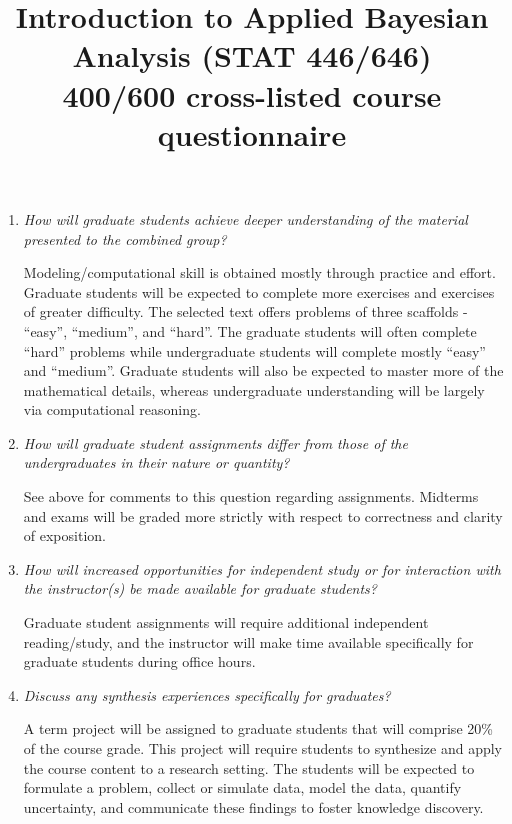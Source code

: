 \documentclass[11pt,onecolumn]{article}
\title{Introduction to Applied Bayesian Analysis (STAT 446/646) \\ 400/600 cross-listed course questionnaire}
\begin{document}
\date{}
\maketitle

\vspace{-0.75in}

\begin{enumerate}
\item \emph{How will graduate students achieve deeper understanding of the material presented to the combined group?}

  Modeling/computational skill is obtained mostly through practice and effort. Graduate students will be expected to complete more exercises and exercises of greater difficulty. The selected text offers problems of three scaffolds - ``easy'', ``medium'', and ``hard''. The graduate students will often complete ``hard'' problems while undergraduate students will complete mostly ``easy'' and ``medium''. Graduate students will also be expected to master more of the mathematical details, whereas undergraduate understanding will be largely via computational reasoning.
  
\item \emph{How will graduate student assignments differ from those of the undergraduates in their nature or quantity?}

  See above for comments to this question regarding assignments. Midterms and exams will be graded more strictly with respect to correctness and clarity of exposition.

\item \emph{How will increased opportunities for independent study or for interaction with the instructor(s) be made available for graduate students?}

  Graduate student assignments will require additional independent reading/study, and the instructor will make time available specifically for graduate students during office hours. 
  
\item \emph{Discuss any synthesis experiences specifically for graduates?}

  A term project will be assigned to graduate students that will comprise 20\% of the course grade. This project will require students to synthesize and apply the course content to a research setting. The students will be expected to formulate a problem, collect or simulate data, model the data, quantify uncertainty, and communicate these findings to foster knowledge discovery.


\end{enumerate}
\end{document}
